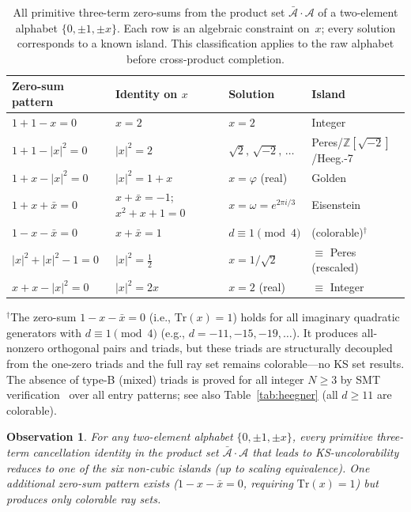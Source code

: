 \documentclass[12pt,a4paper]{article}
\newtheorem{observation}[theorem]{Observation}
\newcommand{\Z}{\mathbb{Z}}
\begin{document}
\begin{table}[h]
\centering
\caption{All primitive three-term zero-sums from the product set $\bar{\mathcal{A}} \cdot \mathcal{A}$ of a two-element alphabet $\{0, \pm 1, \pm x\}$. Each row is an algebraic constraint on~$x$; every solution corresponds to a known island. This classification applies to the raw alphabet before cross-product completion.}
\label{tab:two-element}
\footnotesize
\setlength{\tabcolsep}{3pt}
\begin{tabular}{@{}llll@{}}
\toprule
Zero-sum pattern & Identity on $x$ & Solution & Island \\
\midrule
$1 + 1 - x = 0$ & $x = 2$ & $x = 2$ & Integer \\
$1 + 1 - |x|^2 = 0$ & $|x|^2 = 2$ & $\sqrt{2},\, \sqrt{-2},\, \ldots$ & Peres/$\Z[\!\sqrt{-2}]$/Heeg.-7 \\
$1 + x - |x|^2 = 0$ & $|x|^2 = 1 + x$ & $x = \varphi$ (real) & Golden \\
$1 + x + \bar{x} = 0$ & $x + \bar{x} = -1$; $x^2{+}x{+}1{=}0$ & $x = \omega = e^{2\pi i/3}$ & Eisenstein \\
$1 - x - \bar{x} = 0$ & $x + \bar{x} = 1$ & $d \equiv 1 \pmod{4}$ & (colorable)$^\dagger$ \\
$|x|^2 + |x|^2 - 1 = 0$ & $|x|^2 = \tfrac{1}{2}$ & $x = 1/\sqrt{2}$ & $\equiv$ Peres (rescaled) \\
$x + x - |x|^2 = 0$ & $|x|^2 = 2x$ & $x = 2$ (real) & $\equiv$ Integer \\
\bottomrule
\end{tabular}

\noindent $^\dagger$The zero-sum $1 - x - \bar{x} = 0$ (i.e., $\mathrm{Tr}(x) = 1$) holds for all imaginary quadratic generators with $d \equiv 1 \pmod{4}$ (e.g., $d = -11, -15, -19, \ldots$).  It produces all-nonzero orthogonal pairs and triads, but these triads are structurally decoupled from the one-zero triads and the full ray set remains colorable---no KS set results.  The absence of type-B (mixed) triads is proved for all integer $N \geq 3$ by SMT verification~\cite{deMouraBjorner2008} over all entry patterns; see also Table~\ref{tab:heegner} (all $d \geq 11$ are colorable).
\end{table}

\begin{observation}\label{obs:two-element}
For any two-element alphabet $\{0, \pm 1, \pm x\}$, every primitive three-term cancellation identity in the product set $\bar{\mathcal{A}} \cdot \mathcal{A}$ that leads to KS-uncolorability reduces to one of the six non-cubic islands (up to scaling equivalence).  One additional zero-sum pattern exists ($1 - x - \bar{x} = 0$, requiring $\mathrm{Tr}(x) = 1$) but produces only colorable ray sets.
\end{observation}
\end{document}
